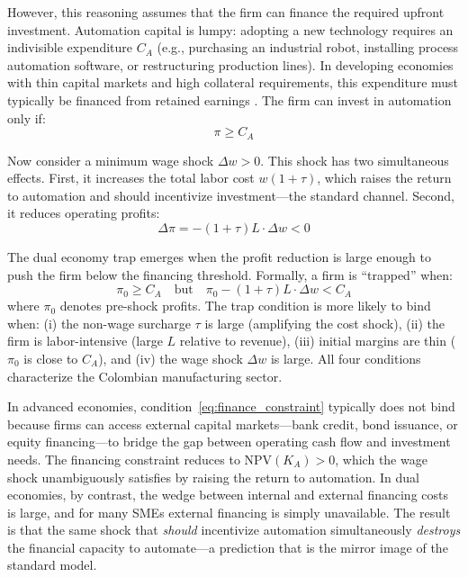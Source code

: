 \documentclass[5p,times,authoryear]{elsarticle}
\begin{document}
However, this reasoning assumes that the firm can finance the required upfront investment. Automation capital is lumpy: adopting a new technology requires an indivisible expenditure $C_A$ (e.g., purchasing an industrial robot, installing process automation software, or restructuring production lines). In developing economies with thin capital markets and high collateral requirements, this expenditure must typically be financed from retained earnings \citep{busso2020}. The firm can invest in automation only if:
\begin{equation}
\label{eq:finance_constraint}
\pi \geq C_A
\end{equation}

Now consider a minimum wage shock $\Delta w > 0$. This shock has two simultaneous effects. First, it increases the total labor cost $w(1+\tau)$, which raises the return to automation and should incentivize investment---the standard channel. Second, it reduces operating profits:
\begin{equation}
\label{eq:profit_reduction}
\Delta \pi = -(1+\tau) L \cdot \Delta w < 0
\end{equation}

The dual economy trap emerges when the profit reduction is large enough to push the firm below the financing threshold. Formally, a firm is ``trapped'' when:
\begin{equation}
\label{eq:trap_condition}
\pi_0 \geq C_A \quad \text{but} \quad \pi_0 - (1+\tau)L \cdot \Delta w < C_A
\end{equation}
where $\pi_0$ denotes pre-shock profits. The trap condition is more likely to bind when: (i) the non-wage surcharge $\tau$ is large (amplifying the cost shock), (ii) the firm is labor-intensive (large $L$ relative to revenue), (iii) initial margins are thin ($\pi_0$ is close to $C_A$), and (iv) the wage shock $\Delta w$ is large. All four conditions characterize the Colombian manufacturing sector.

In advanced economies, condition~\eqref{eq:finance_constraint} typically does not bind because firms can access external capital markets---bank credit, bond issuance, or equity financing---to bridge the gap between operating cash flow and investment needs. The financing constraint reduces to $\text{NPV}(K_A) > 0$, which the wage shock unambiguously satisfies by raising the return to automation. In dual economies, by contrast, the wedge between internal and external financing costs is large, and for many SMEs external financing is simply unavailable. The result is that the same shock that \emph{should} incentivize automation simultaneously \emph{destroys} the financial capacity to automate---a prediction that is the mirror image of the standard model.
\end{document}
